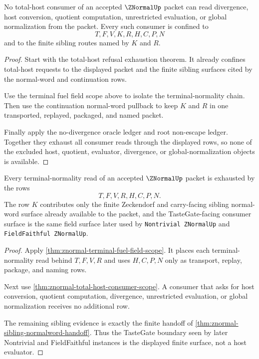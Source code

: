 \begin{theorem}
\label{thm:znormal-total-host-consumer-scope}
No total-host consumer of an accepted $\ZNormalUp$ packet can read divergence,
host conversion, quotient computation, unrestricted evaluation, or global
normalization from the packet. Every such consumer is confined to
$$
T,F,V,K,R,H,C,P,N
$$
and to the finite sibling routes named by $K$ and $R$.
\end{theorem}
\begin{proof}
Start with the total-host refusal exhaustion theorem. It already confines
total-host requests to the displayed packet and the finite sibling surfaces
cited by the normal-word and continuation rows.

Use the terminal fuel field scope above to isolate the terminal-normality
chain. Then use the continuation normal-word pullback to keep $K$ and $R$ in
one transported, replayed, packaged, and named packet.

Finally apply the no-divergence oracle ledger and root non-escape ledger.
Together they exhaust all consumer reads through the displayed rows, so none
of the excluded host, quotient, evaluator, divergence, or global-normalization
objects is available.
\end{proof}

\begin{theorem}
\label{thm:znormal-terminal-fuel-row-exhaustion}
Every terminal-normality read of an accepted $\ZNormalUp$ packet is exhausted
by the rows
$$
T,F,V,R,H,C,P,N.
$$
The row $K$ contributes only the finite Zeckendorf and carry-facing sibling
normal-word surface already available to the packet, and the TasteGate-facing
consumer surface is the same field surface later used by
\texttt{Nontrivial ZNormalUp} and \texttt{FieldFaithful ZNormalUp}.
\end{theorem}
\begin{proof}
Apply \autoref{thm:znormal-terminal-fuel-field-scope}. It places each
terminal-normality read behind $T,F,V,R$ and uses $H,C,P,N$ only as transport,
replay, package, and naming rows.

Next use \autoref{thm:znormal-total-host-consumer-scope}. A consumer that asks
for host conversion, quotient computation, divergence, unrestricted
evaluation, or global normalization receives no additional row.

The remaining sibling evidence is exactly the finite handoff of
\autoref{thm:znormal-sibling-normalword-handoff}. Thus the TasteGate boundary
seen by later Nontrivial and FieldFaithful instances is the displayed finite
surface, not a host evaluator.
\end{proof}

